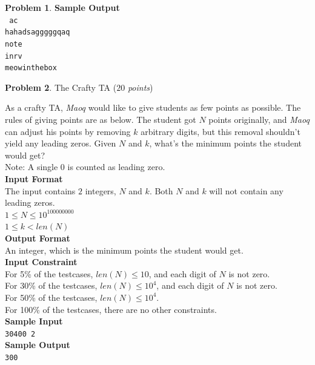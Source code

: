 \documentclass[12pt,a4paper]{report}
\newcommand{\points}[1]{ ($#1$ \textit{points}) }
\theoremstyle{definition}
\newtheorem{problem}{\textbf{Problem}}
\newcommand\NoIndent[1]{
  \par\vbox{\parbox[t]{\linewidth}{#1}}
}
\newcommand{\solution}{\textbf{\NoIndent{Solution.}}}
\theoremstyle{definition}
\begin{document}
\begin{problem}
\textbf{\large Sample Output}\\
\texttt{
    ac\\
    hahadsagggggqaq\\
    note\\
    inrv\\
    meowinthebox\\
}
\end{problem}
\newpage

\begin{problem}The Crafty TA \points{20}

As a crafty TA, \textit{Maoq} would like to give students as few points as possible. The rules of giving points are as below.
The student got $N$ points originally, and \textit{Maoq} can adjust his points by removing $k$ arbitrary digits, but this removal shouldn't yield any leading zeros. Given $N$ and $k$, what's the minimum points the student would get?\\
Note: A single \(0\) is counted as leading zero.\\

\textbf{\large Input Format}\\
The input contains $2$ integers, $N$ and $k$. Both $N$ and $k$ will not contain any leading zeros.\\
$1\leq N\leq 10^{100000000}$\\
$1\leq k<len(N)$\\

\textbf{\large Output Format}\\
An integer, which is the minimum points the student would get.\\

\textbf{\large Input Constraint}\\
For 5\% of the testcases, $len(N)\leq 10$, and each digit of $N$ is not zero.\\
For 30\% of the testcases, $len(N)\leq 10^4$, and each digit of $N$ is not zero.\\
For 50\% of the testcases, $len(N)\leq 10^4$.\\
For 100\% of the testcases, there are no other constraints.\\

\textbf{\large Sample Input}\\
\texttt{30400 2}\\

\textbf{\large Sample Output}\\
\texttt{300}\\
\end{problem}
\end{document}
